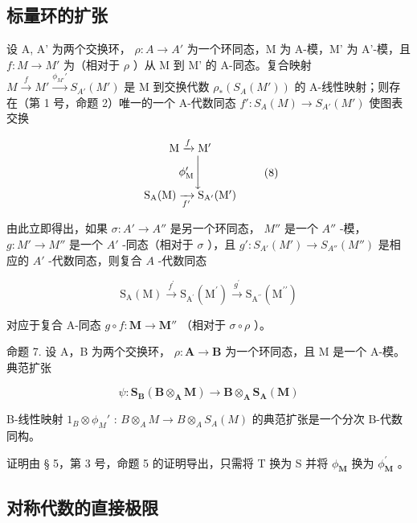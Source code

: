 \subsection{标量环的扩张}

设 A, A' 为两个交换环， \(\rho: A \to A'\) 为一个环同态，M 为 A-模，M' 为 A'-模，且 \(f: M \to M'\) 为（相对于 \(\rho\) ）从 M 到 M' 的 A-同态。复合映射 \(M \xrightarrow{f} M' \xrightarrow{\phi_{M'}'} S_{A'}(M')\) 是 M 到交换代数 \(\rho_*(S_A(M'))\) 的 A-线性映射；则存在（第 1 号，命题 2）唯一的一个 A-代数同态 \(f': S_A(M) \to S_{A'}(M')\) 使图表交换

\[
\begin{array}{c} \mathrm{M} \xrightarrow {f} \mathrm{M} ^ {\prime} \\ \phi_ {\mathrm{M}} ^ {\prime} \Biggl \downarrow \\ \mathrm{S} _ {\mathrm{A}} (\mathrm{M}) \xrightarrow [ f ^ {\prime} ]{} \mathrm{S} _ {\mathrm{A} ^ {\prime}} (\mathrm{M} ^ {\prime}) \end{array}\tag{8}
\]

由此立即得出，如果 \(\sigma: A' \to A''\) 是另一个环同态， \(M''\) 是一个 \(A''\) -模， \(g: M' \to M''\) 是一个 \(A'\) -同态（相对于 \(\sigma\) ），且 \(g': S_{A'}(M') \to S_{A''}(M'')\) 是相应的 \(A'\) -代数同态，则复合 \(A\) -代数同态

\[
\mathrm{S} _ {\mathrm{A}} (\mathrm{M}) \xrightarrow {f ^ {\prime}} \mathrm{S} _ {\mathrm{A} ^ {\prime}} \left(\mathrm{M} ^ {\prime}\right) \xrightarrow {g ^ {\prime}} \mathrm{S} _ {\mathrm{A} ^ {\prime \prime}} \left(\mathrm{M} ^ {\prime \prime}\right)\tag{9}
\]

对应于复合 A-同态 \(g \circ f: \mathbf{M} \to \mathbf{M}''\) （相对于 \(\sigma \circ \rho\) ）。

命题 7. 设 A，B 为两个交换环， \(\rho: \mathbf{A} \to \mathbf{B}\) 为一个环同态，且 M 是一个 A-模。典范扩张

\[
\psi \colon \mathbf {S} _ {\mathbf {B}} (\mathbf {B} \otimes_ {\mathbf {A}} \mathbf {M}) \rightarrow \mathbf {B} \otimes_ {\mathbf {A}} \mathbf {S} _ {\mathbf {A}} (\mathbf {M})
\]

B-线性映射 \(1_{B} \otimes \phi_{M}'\) : \(B \otimes_{A} M \to B \otimes_{A} S_{A}(M)\) 的典范扩张是一个分次 B-代数同构。

证明由 § 5，第 3 号，命题 5 的证明导出，只需将 T 换为 S 并将 \(\phi_{\mathbf{M}}\) 换为 \(\phi_{\mathbf{M}}^{\prime}\) 。

\subsection{对称代数的直接极限}

